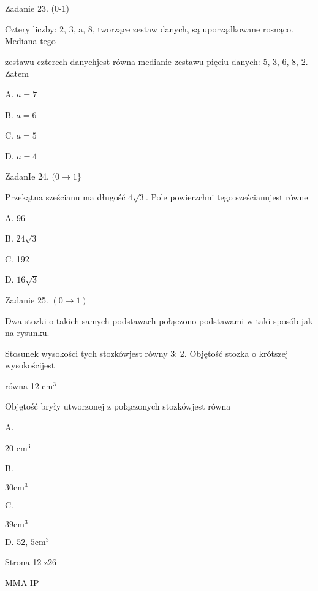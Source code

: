 \documentclass[a4paper,12pt]{article}
\begin{document}
Zadanie 23. (0-1)

Cztery liczby: 2, 3, a, 8, tworzące zestaw danych, są uporządkowane rosnąco. Mediana tego

zestawu czterech danychjest równa medianie zestawu pięciu danych: 5, 3, 6, 8, 2. Zatem

A. $a=7$

B. $a=6$

C. $a=5$

D. $a=4$

ZadanIe 24. $(0\rightarrow 1$\}

Przekątna sześcianu ma długość $4\sqrt{3}$. Pole powierzchni tego sześcianujest równe

A. 96

B. $24\sqrt{3}$

C. 192

D. $16\sqrt{3}$

Zadanie 25. $(0\rightarrow 1)$

Dwa stozki o takich samych podstawach połączono podstawami w taki sposób jak na rysunku.

Stosunek wysokości tych stozkówjest równy 3: 2. Objętość stozka o krótszej wysokościjest

równa 12 $\mathrm{c}\mathrm{m}^{3}$

Objętość bryły utworzonej z połączonych stozkówjest równa

A.

20 $\mathrm{c}\mathrm{m}^{3}$

B.

$30\mathrm{c}\mathrm{m}^{3}$

C.

$39\mathrm{c}\mathrm{m}^{3}$

D. 52, $5\mathrm{c}\mathrm{m}^{3}$

Strona 12 z26

MMA-IP
\end{document}
